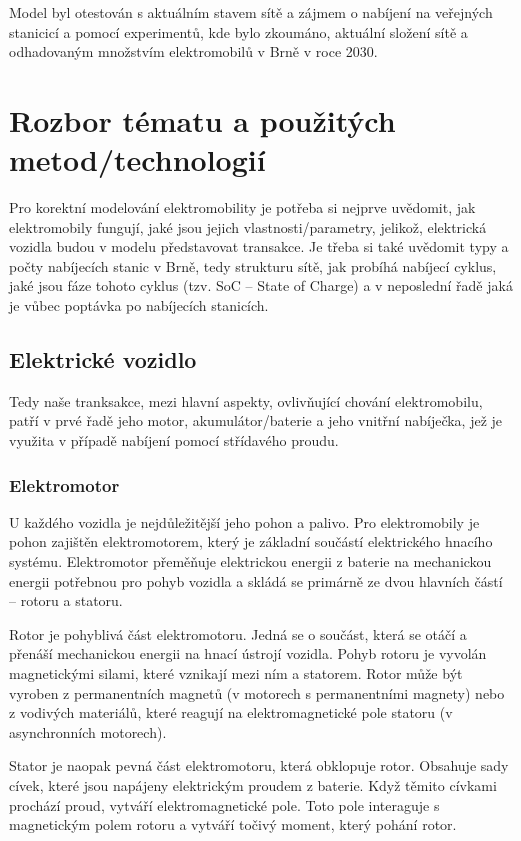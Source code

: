 \documentclass[a4paper,11pt]{article}
\begin{document}
Model byl otestován s aktuálním stavem sítě a zájmem o nabíjení na veřejných stanicicí a pomocí 
experimentů, kde bylo zkoumáno, aktuální složení sítě a odhadovaným množstvím elektromobilů v Brně
v roce 2030.
\section{Rozbor tématu a použitých metod/technologií}
Pro korektní modelování elektromobility je potřeba si nejprve uvědomit, jak elektromobily fungují, 
jaké jsou jejich vlastnosti/parametry, jelikož, elektrická vozidla budou v modelu představovat transakce.
Je třeba si také uvědomit typy a počty nabíjecích stanic v Brně, tedy strukturu sítě, jak probíhá
nabíjecí cyklus, jaké jsou fáze tohoto cyklus (tzv. SoC -- State of Charge) a v neposlední řadě 
jaká je vůbec poptávka po nabíjecích stanicích.  

\subsection{Elektrické vozidlo}
Tedy naše tranksakce, mezi hlavní aspekty, ovlivňující chování elektromobilu, patří v prvé řadě 
jeho motor, akumulátor/baterie a jeho vnitřní nabíječka, jež je využita v případě nabíjení pomocí
střídavého proudu.

\subsubsection{Elektromotor}
U každého vozidla je nejdůležitější jeho pohon a palivo. Pro elektromobily je pohon zajištěn 
elektromotorem, který je základní součástí elektrického hnacího systému. Elektromotor přeměňuje 
elektrickou energii z baterie na mechanickou energii potřebnou pro pohyb vozidla a skládá se 
primárně ze dvou hlavních částí -- rotoru a statoru. \cite{typy_elektromotoru}

Rotor je pohyblivá část elektromotoru. Jedná se o součást, která se otáčí a přenáší mechanickou 
energii na hnací ústrojí vozidla. Pohyb rotoru je vyvolán magnetickými silami, které vznikají mezi 
ním a statorem. Rotor může být vyroben z permanentních magnetů (v motorech s permanentními magnety) 
nebo z vodivých materiálů, které reagují na elektromagnetické pole statoru (v asynchronních motorech). \cite{elektromotor}

Stator je naopak pevná část elektromotoru, která obklopuje rotor. Obsahuje sady cívek, které jsou 
napájeny elektrickým proudem z baterie. Když těmito cívkami prochází proud, vytváří elektromagnetické 
pole. Toto pole interaguje s magnetickým polem rotoru a vytváří točivý moment, který pohání rotor. \cite{elektromotor}
\end{document}
